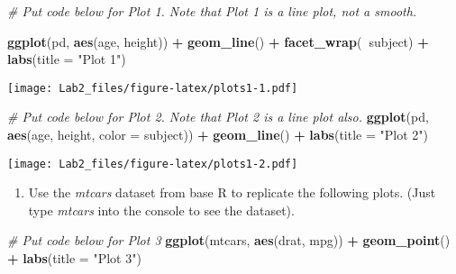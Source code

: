 \documentclass[
]{article}
\newenvironment{Shaded}{\begin{snugshade}}{\end{snugshade}}
\newcommand{\CommentTok}[1]{\textcolor[rgb]{0.56,0.35,0.01}{\textit{#1}}}
\newcommand{\DataTypeTok}[1]{\textcolor[rgb]{0.13,0.29,0.53}{#1}}
\newcommand{\KeywordTok}[1]{\textcolor[rgb]{0.13,0.29,0.53}{\textbf{#1}}}
\newcommand{\NormalTok}[1]{#1}
\newcommand{\OperatorTok}[1]{\textcolor[rgb]{0.81,0.36,0.00}{\textbf{#1}}}
\newcommand{\StringTok}[1]{\textcolor[rgb]{0.31,0.60,0.02}{#1}}
\providecommand{\tightlist}{%
  \setlength{\itemsep}{0pt}\setlength{\parskip}{0pt}}
\begin{document}
\begin{Shaded}
\begin{Highlighting}[]
\CommentTok{# Put code below for Plot 1. Note that Plot 1 is a line plot, not a smooth.}

\KeywordTok{ggplot}\NormalTok{(pd, }\KeywordTok{aes}\NormalTok{(age, height)) }\OperatorTok{+}
\StringTok{  }\KeywordTok{geom_line}\NormalTok{() }\OperatorTok{+}
\StringTok{  }\KeywordTok{facet_wrap}\NormalTok{(}\OperatorTok{~}\NormalTok{subject) }\OperatorTok{+}
\StringTok{  }\KeywordTok{labs}\NormalTok{(}\DataTypeTok{title =} \StringTok{"Plot 1"}\NormalTok{)}
\end{Highlighting}
\end{Shaded}

\texttt{[image: Lab2\_files/figure-latex/plots1-1.pdf]}

\begin{Shaded}
\begin{Highlighting}[]
\CommentTok{# Put code below for Plot 2. Note that Plot 2 is a line plot also.}
\KeywordTok{ggplot}\NormalTok{(pd, }\KeywordTok{aes}\NormalTok{(age, height, }\DataTypeTok{color =}\NormalTok{ subject)) }\OperatorTok{+}
\StringTok{  }\KeywordTok{geom_line}\NormalTok{() }\OperatorTok{+}
\StringTok{  }\KeywordTok{labs}\NormalTok{(}\DataTypeTok{title =} \StringTok{"Plot 2"}\NormalTok{)}
\end{Highlighting}
\end{Shaded}

\texttt{[image: Lab2\_files/figure-latex/plots1-2.pdf]}

\newpage

\begin{enumerate}
\def\labelenumi{\arabic{enumi}.}
\setcounter{enumi}{1}
\tightlist
\item
  Use the \emph{mtcars} dataset from base R to replicate the following
  plots. (Just type \emph{mtcars} into the console to see the dataset).
\end{enumerate}

\begin{Shaded}
\begin{Highlighting}[]
\CommentTok{# Put code below for Plot 3}
\KeywordTok{ggplot}\NormalTok{(mtcars, }\KeywordTok{aes}\NormalTok{(drat, mpg)) }\OperatorTok{+}
\StringTok{  }\KeywordTok{geom_point}\NormalTok{() }\OperatorTok{+}
\StringTok{  }\KeywordTok{labs}\NormalTok{(}\DataTypeTok{title =} \StringTok{"Plot 3"}\NormalTok{)}
\end{Highlighting}
\end{Shaded}
\end{document}

